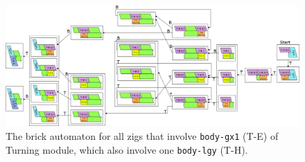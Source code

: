 \documentclass[runningheads]{llncs}
\begin{document}
\begin{figure}[ht]
\centering
\includegraphics[width=\linewidth]{Figs/Turner_BA/gx_left.png}
\caption{The brick automaton for all zigs that involve \texttt{body-gx1} (T-E) of Turning module, which also involve one \texttt{body-lgy} (T-H).}
\label{fig:BA_gx_left}
\end{figure}
\end{document}
